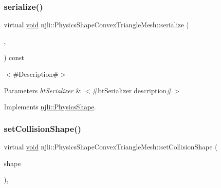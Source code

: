 \mbox{\label{classnjli_1_1_physics_shape_convex_triangle_mesh_a4a009f76809d15cbcd4f4e6f8353f1c4}} 
\subsubsection{\texorpdfstring{serialize()}{serialize()}}
{\footnotesize\ttfamily virtual \mbox{\hyperlink{_thread_8h_af1e856da2e658414cb2456cb6f7ebc66}{void}} njli\+::\+Physics\+Shape\+Convex\+Triangle\+Mesh\+::serialize (\begin{DoxyParamCaption}\item[{\mbox{\hyperlink{_thread_8h_af1e856da2e658414cb2456cb6f7ebc66}{void}} $\ast$}]{,  }\item[{bt\+Serializer $\ast$}]{ }\end{DoxyParamCaption}) const\hspace{0.3cm}{\ttfamily [virtual]}}

$<$\#\+Description\#$>$


\begin{DoxyParams}{Parameters}
{\em bt\+Serializer} & $<$\#bt\+Serializer description\#$>$ \\
\hline
\end{DoxyParams}


Implements \mbox{\hyperlink{classnjli_1_1_physics_shape_a2ac8a109a5ad67ee79f40ce8f28337cf}{njli\+::\+Physics\+Shape}}.

\mbox{\label{classnjli_1_1_physics_shape_convex_triangle_mesh_a5fb1e1a0a980e346a919d155ac5c2c82}} 
\subsubsection{\texorpdfstring{set\+Collision\+Shape()}{setCollisionShape()}}
{\footnotesize\ttfamily virtual \mbox{\hyperlink{_thread_8h_af1e856da2e658414cb2456cb6f7ebc66}{void}} njli\+::\+Physics\+Shape\+Convex\+Triangle\+Mesh\+::set\+Collision\+Shape (\begin{DoxyParamCaption}\item[{const bt\+Collision\+Shape \&}]{shape }\end{DoxyParamCaption})\hspace{0.3cm}{\ttfamily [protected]}, {\ttfamily [virtual]}}




